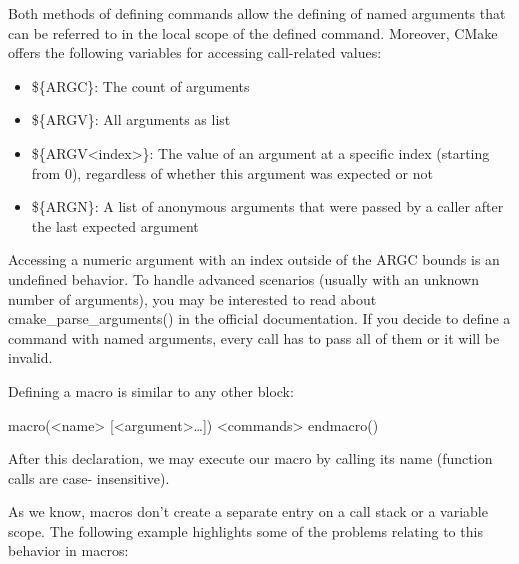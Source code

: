 Both methods of defining commands allow the defining of named arguments that can be referred to in the local scope of the defined command. Moreover, CMake offers the following variables for accessing call-related values:

\begin{itemize}
\item
\$\{ARGC\}: The count of arguments

\item
\$\{ARGV\}: All arguments as list

\item
\$\{ARGV<index>\}: The value of an argument at a specific index (starting from 0), regardless of whether this argument was expected or not

\item
\$\{ARGN\}: A list of anonymous arguments that were passed by a caller after the last expected argument
\end{itemize}

Accessing a numeric argument with an index outside of the ARGC bounds is an undefined behavior. To handle advanced scenarios (usually with an unknown number of arguments), you may be interested to read about cmake\_parse\_arguments() in the official documentation. If you decide to define a command with named arguments, every call has to pass all of them or it will be invalid.


Defining a macro is similar to any other block:

\begin{shell}
macro(<name> [<argument>…])
    <commands>
endmacro()
\end{shell}

After this declaration, we may execute our macro by calling its name (function calls are case- insensitive).

As we know, macros don’t create a separate entry on a call stack or a variable scope. The following example highlights some of the problems relating to this behavior in macros:



